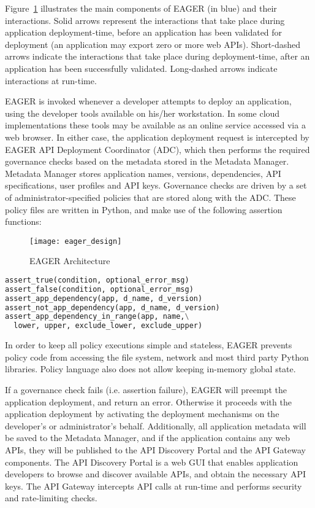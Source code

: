 Figure~\ref{fig:eager_design} illustrates the main components of EAGER (in
blue) and their interactions. Solid arrows represent the interactions that take place
during application deployment-time, before an application has been validated
for deployment (an application may export zero or more web APIs). 
Short-dashed arrows indicate the interactions that take place
during deployment-time, after an application has been successfully validated.
Long-dashed arrows indicate interactions at run-time.

EAGER is invoked whenever a developer attempts to deploy an application, using
the developer tools available on his/her workstation. In some cloud
implementations these tools may be available as an online service accessed
via a web browser. In either case, the application deployment request is
intercepted by EAGER API Deployment Coordinator (ADC), which then performs the 
required governance checks based on the metadata stored in the Metadata Manager.
Metadata Manager stores application names, versions, dependencies, API specifications,
user profiles and API keys.
Governance checks are driven by a set of administrator-specified policies that
are stored along with the ADC. These policy files are written in Python, and make use of 
the following assertion functions:

\begin{figure}
\centering
\texttt{[image: eager\_design]}
\caption{EAGER Architecture}
\label{fig:eager_design}
\end{figure}

{\footnotesize 
\begin{lstlisting}[language=Python, frame=single]
assert_true(condition, optional_error_msg)
assert_false(condition, optional_error_msg)
assert_app_dependency(app, d_name, d_version)
assert_not_app_dependency(app, d_name, d_version)
assert_app_dependency_in_range(app, name,\
  lower, upper, exclude_lower, exclude_upper)
\end{lstlisting}
}

In order to keep all policy executions simple and stateless, EAGER prevents
policy code from accessing the file system, network and most third party Python
libraries. Policy language also does not allow keeping in-memory global state.

If a governance check fails (i.e. assertion failure), EAGER will preempt the 
application deployment, and
return an error. Otherwise it proceeds with the application deployment by
activating the deployment mechanisms on the developer's or administrator's
behalf. Additionally, all application metadata will be saved to the Metadata Manager, and
if the application contains any web APIs, they will be published to the API Discovery Portal
and the API Gateway components. The API Discovery Portal is a web GUI that enables 
application developers to browse and
discover available APIs, and obtain the necessary API keys. The API Gateway intercepts
API calls at run-time and performs security and rate-limiting checks. %

